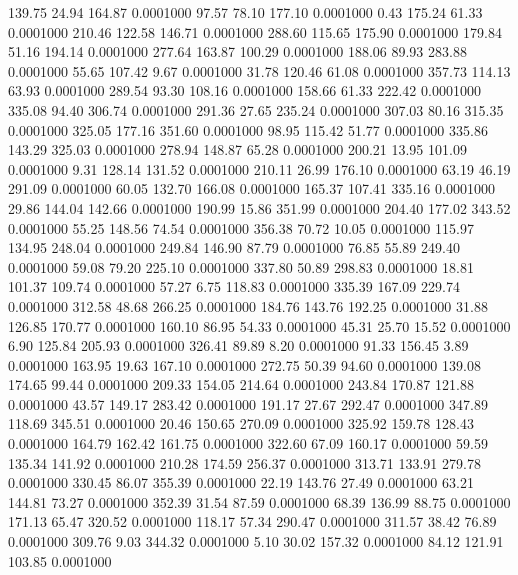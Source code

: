  139.75   24.94  164.87   0.0001000
  97.57   78.10  177.10   0.0001000
   0.43  175.24   61.33   0.0001000
 210.46  122.58  146.71   0.0001000
 288.60  115.65  175.90   0.0001000
 179.84   51.16  194.14   0.0001000
 277.64  163.87  100.29   0.0001000
 188.06   89.93  283.88   0.0001000
  55.65  107.42    9.67   0.0001000
  31.78  120.46   61.08   0.0001000
 357.73  114.13   63.93   0.0001000
 289.54   93.30  108.16   0.0001000
 158.66   61.33  222.42   0.0001000
 335.08   94.40  306.74   0.0001000
 291.36   27.65  235.24   0.0001000
 307.03   80.16  315.35   0.0001000
 325.05  177.16  351.60   0.0001000
  98.95  115.42   51.77   0.0001000
 335.86  143.29  325.03   0.0001000
 278.94  148.87   65.28   0.0001000
 200.21   13.95  101.09   0.0001000
   9.31  128.14  131.52   0.0001000
 210.11   26.99  176.10   0.0001000
  63.19   46.19  291.09   0.0001000
  60.05  132.70  166.08   0.0001000
 165.37  107.41  335.16   0.0001000
  29.86  144.04  142.66   0.0001000
 190.99   15.86  351.99   0.0001000
 204.40  177.02  343.52   0.0001000
  55.25  148.56   74.54   0.0001000
 356.38   70.72   10.05   0.0001000
 115.97  134.95  248.04   0.0001000
 249.84  146.90   87.79   0.0001000
  76.85   55.89  249.40   0.0001000
  59.08   79.20  225.10   0.0001000
 337.80   50.89  298.83   0.0001000
  18.81  101.37  109.74   0.0001000
  57.27    6.75  118.83   0.0001000
 335.39  167.09  229.74   0.0001000
 312.58   48.68  266.25   0.0001000
 184.76  143.76  192.25   0.0001000
  31.88  126.85  170.77   0.0001000
 160.10   86.95   54.33   0.0001000
  45.31   25.70   15.52   0.0001000
   6.90  125.84  205.93   0.0001000
 326.41   89.89    8.20   0.0001000
  91.33  156.45    3.89   0.0001000
 163.95   19.63  167.10   0.0001000
 272.75   50.39   94.60   0.0001000
 139.08  174.65   99.44   0.0001000
 209.33  154.05  214.64   0.0001000
 243.84  170.87  121.88   0.0001000
  43.57  149.17  283.42   0.0001000
 191.17   27.67  292.47   0.0001000
 347.89  118.69  345.51   0.0001000
  20.46  150.65  270.09   0.0001000
 325.92  159.78  128.43   0.0001000
 164.79  162.42  161.75   0.0001000
 322.60   67.09  160.17   0.0001000
  59.59  135.34  141.92   0.0001000
 210.28  174.59  256.37   0.0001000
 313.71  133.91  279.78   0.0001000
 330.45   86.07  355.39   0.0001000
  22.19  143.76   27.49   0.0001000
  63.21  144.81   73.27   0.0001000
 352.39   31.54   87.59   0.0001000
  68.39  136.99   88.75   0.0001000
 171.13   65.47  320.52   0.0001000
 118.17   57.34  290.47   0.0001000
 311.57   38.42   76.89   0.0001000
 309.76    9.03  344.32   0.0001000
   5.10   30.02  157.32   0.0001000
  84.12  121.91  103.85   0.0001000

